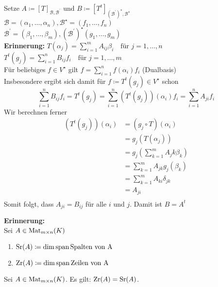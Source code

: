 \begin{subproof*}
	Setze $ A \coloneqq  [T]_{\mathcal{B} , \mathcal{B} ^\prime} $ und $ B \coloneqq [T^t]_{(\mathcal{B}^\prime)^\star , \mathcal{B} ^\star  }  $\\
	$ \mathcal{B} = (\alpha_1, \dotsc, \alpha_n), \mathcal{B}^\star  = (f_1, \dotsc, f_n) $\\
	$ \mathcal{B} ^\prime = (\beta_1, \dotsc, \beta_m), (\mathcal{B} ^\prime)^\star (g_1, \dotsc, g_m) $\\
	\textbf{Erinnerung:} $ T(\alpha_j) = \sum_{i = 1}^{m} A_{ij} \beta_i \quad \text{für } j = 1, \dotsc, n $\\
	$ T^t(g_j) = \sum_{i = 1}^{n} B_{ij} f_i \quad \text{für } j = 1, \dotsc, m $\\
	Für beliebiges $ f \in V^\star  $ gilt $ f = \sum_{i = 1}^{n} f(\alpha_i)f_i $ (Dualbasis)\\
	Insbesondere ergibt sich damit für $ f \coloneqq  T^t(g_j) \in V^\star  $ schon
	\[
		\sum_{i = 1}^{n} B_{ij} f_i = T^t(g_j) = \sum_{i = 1}^{n} (T^t(g_j))(\alpha_i)f_i = \sum_{i = 1}^{n} A_{ji} f_i
	\]
	Wir berechnen ferner
	\begin{align*}
		(T^t(g_j))(\alpha_i) &= (g_j \circ T)(\alpha_i) \\
		~ &= g_j(T(\alpha_j)) \\
		~ &= g_j \left( \sum_{k=1}^{m} A_jk \beta_k \right)  \\
		~ &= \sum_{k = 1}^{m} A_{jk} g_j (\beta_k)  \\
		~ &= \sum_{k = 1}^{m} A_{ki} \delta_{jk}  \\
		~ &= A_{ji}  \\
	\end{align*}
	Somit folgt, dass $ A_{ji} = B_{ij}  $ für alle $ i $ und $ j $. Damit ist $ B = A^t $
	
\end{subproof*}

\textbf{Erinnerung:}\\
Sei $ A \in \operatorname{Mat}_{m \times n} (K) $ 
\begin{enumerate}[label=(\roman*)]
	\item $ \operatorname{Sr}(A) \coloneqq \dim \operatorname{span} \text{Spalten von A} $
	\item $ \operatorname{Zr}(A) \coloneqq \dim \operatorname{span} \text{Zeilen von A} $
\end{enumerate}

\begin{subcorollary}
	Sei $ A \in \operatorname{Mat}_{m \times n} (K) $.
	Es gilt: $ \operatorname{Zr}(A) = \operatorname{Sr} ( A ) $.
\end{subcorollary}

